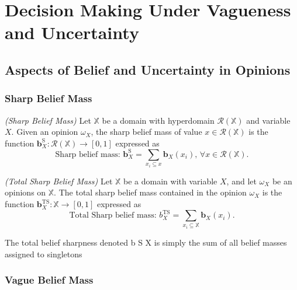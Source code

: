 
\section{Decision Making Under Vagueness and
Uncertainty}

\subsection{Aspects of Belief and Uncertainty in Opinions}

\subsubsection{Sharp Belief Mass}

\begin{definition}
    \emph{(Sharp Belief Mass)} Let $\mathbb{X}$ be a domain with hyperdomain $\mathcal{R}(\mathbb{X})$
and variable $X$. Given an opinion $\omega_X$, the sharp belief mass of value $x \in \mathcal{R}(\mathbb{X})$ is the function $\mathbf{b}^{\mathrm{S}}_X : \mathcal{R}(\mathbb{X}) \rightarrow [0, 1]$ expressed as
    \begin{equation}
        \text{Sharp belief mass: } \mathbf{b}^{\mathrm{S}}_X = \sum\limits_{x_i \subseteq x} \mathbf{b}_X(x_i)\text{, }\forall x \in \mathcal{R}(\mathbb{X})\text{.}
    \end{equation}
\end{definition}

\begin{definition}
    \emph{(Total Sharp Belief Mass)} Let $\mathbb{X}$ be a domain with variable $X$, and let $\omega_X$ be an opinions on $\mathbb{X}$. The total sharp belief mass contained in the opinion $\omega_X$ is the function $\mathbf{b}^{\mathrm{TS}}_X : \mathbb{X} \rightarrow [0, 1]$ expressed as
    \begin{equation}
        \text{Total Sharp belief mass: } b^{\mathrm{TS}}_X = \sum\limits_{x_i \subseteq \mathbb{X}} \mathbf{b}_X(x_i)\text{.}
    \end{equation}
\end{definition}

The total belief sharpness denoted b S X is simply the sum of all belief masses
assigned to singletons

\subsubsection{Vague Belief Mass}

